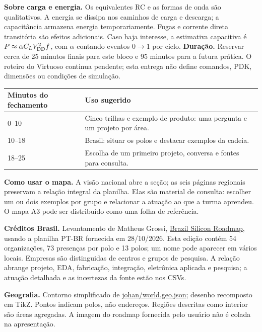 \documentclass[11pt,a4paper]{article}
\begin{document}
\textbf{Sobre carga e energia.} Os equivalentes RC e as formas de onda são qualitativos. A energia se dissipa nos caminhos de carga e descarga; a capacitância armazena energia temporariamente. Fugas e corrente direta transitória são efeitos adicionais. Caso haja interesse, a estimativa capacitiva é $P\approx\alpha C_LV_{\mathrm{DD}}^2f$, com $\alpha$ contando eventos 0$\rightarrow$1 por ciclo.
\newpage
{}
\textbf{Duração.} Reservar cerca de 25 minutos finais para este bloco e 95 minutos para a futura prática. O roteiro do Virtuoso continua pendente; esta entrega não define comandos, PDK, dimensões ou condições de simulação.

\begin{center}\small\begin{tabularx}{\linewidth}{lX}\toprule Minutos do fechamento & Uso sugerido\\\midrule
0--10 & Cinco trilhas e exemplo de produto: uma pergunta e um projeto por área.\\
10--18 & Brasil: situar os polos e destacar exemplos da cadeia.\\
18--25 & Escolha de um primeiro projeto, conversa e fontes para consulta.\\\bottomrule\end{tabularx}\end{center}
\textbf{Como usar o mapa.} A visão nacional abre a seção; as seis páginas regionais preservam a relação integral da planilha. Elas são material de consulta: escolher um ou dois exemplos por grupo e relacionar a atuação ao que a turma aprendeu. O mapa A3 pode ser distribuído como uma folha de referência.

\textbf{Créditos Brasil.} Levantamento de Matheus Grossi, \href{https://github.com/MattGrossi12/brazil_silicon_roadmap}{Brazil Silicon Roadmap}, usando a planilha PT-BR fornecida em 28/10/2026. Esta edição contém 54 organizações, 73 presenças por polo e 13 polos; um nome pode aparecer em vários locais. Empresas são distinguidas de centros e grupos de pesquisa. A relação abrange projeto, EDA, fabricação, integração, eletrônica aplicada e pesquisa; a atuação detalhada e as incertezas da fonte estão nos CSVs.

\textbf{Geografia.} Contorno simplificado de \href{https://github.com/johan/world.geo.json/blob/master/countries/BRA.geo.json}{johan/world.geo.json}; desenho recomposto em TikZ. Pontos indicam polos, não endereços. Regiões descritas como interior são áreas agregadas. A imagem do roadmap fornecida pelo usuário não é colada na apresentação.
\end{document}
